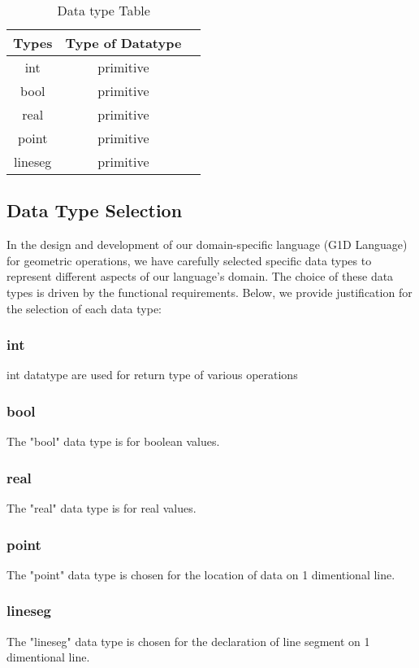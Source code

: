\documentclass{article}
\begin{document}
\begin{table}[h]
\centering
\caption{Data type Table}
\label{tab:Datatypes}
\begin{tabular}{ c c c }
\hline
Types & Type of Datatype  \\
\hline
int & primitive \\
bool &primitive\\
real &primitive\\
point & primitive \\
lineseg & primitive \\

\hline
\end{tabular}
\end{table}

\subsection{Data Type Selection}
In the design and development of our domain-specific language (G1D Language) for geometric operations, we have carefully selected specific data types to represent different aspects of our language's domain. The choice of these data types is driven by the functional requirements. Below, we provide justification for the selection of each data type:

\subsubsection{int}
int datatype are used for return type of various operations

\subsubsection{bool}
The "bool" data type is for boolean values. 

\subsubsection{real}
The "real" data type is for real values.

\subsubsection{point}
The "point" data type is chosen for the location of data on 1 dimentional line.

\subsubsection{lineseg}
The "lineseg" data type is chosen for the declaration  of line segment on 1 dimentional line.
\end{document}
